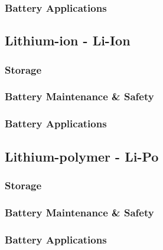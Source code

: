 \documentclass[a4paper,11pt, twocolumn]{article}
\begin{document}
\subsubsection{Battery Applications}


\subsection{Lithium-ion - Li-Ion}

\subsubsection{Storage}

\subsubsection{Battery Maintenance \& Safety}

\subsubsection{Battery Applications}


\subsection{Lithium-polymer - Li-Po}

\subsubsection{Storage}

\subsubsection{Battery Maintenance \& Safety}

\subsubsection{Battery Applications}


\newpage
\onecolumn


\end{document}
